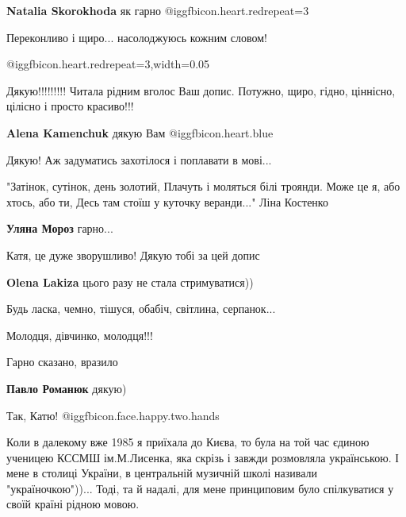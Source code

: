 \begin{itemize}
\begin{itemize} %
\textbf{Natalia Skorokhoda} як гарно @igg{fbicon.heart.red}{repeat=3}
\end{itemize} %

Переконливо і щиро... насолоджуюсь кожним словом!


@igg{fbicon.heart.red}{repeat=3,width=0.05}

Дякую!!!!!!!!! Читала рідним вголос Ваш допис. Потужно, щиро, гідно, ціннісно,
цілісно і просто красиво!!!

\begin{itemize} %
\textbf{Alena Kamenchuk} дякую Вам  @igg{fbicon.heart.blue} 
\end{itemize} %

Дякую! Аж задуматись захотілося і поплавати в мові...

\obeycr
"Затінок, сутінок, день золотий,
Плачуть і моляться білі троянди.
Може це я, або хтось, або ти,
Десь там стоїш у куточку веранди..." Ліна Костенко
\restorecr

\begin{itemize} %
\textbf{Уляна Мороз} гарно...
\end{itemize} %

Катя, це дуже зворушливо! Дякую тобі за цей допис

\begin{itemize} %
\textbf{Olena Lakiza} цього разу не стала стримуватися))
\end{itemize} %

Будь ласка, чемно, тішуся, обабіч, світлина, серпанок...

Молодця, дівчинко, молодця!!!

Гарно сказано, вразило

\begin{itemize} %
\textbf{Павло Романюк} дякую)
\end{itemize} %

Так, Катю! @igg{fbicon.face.happy.two.hands} 

Коли в далекому вже 1985 я приїхала до Києва, то була на той час єдиною
ученицею КССМШ ім.М.Лисенка, яка скрізь і завжди розмовляла українською. І мене
в столиці України, в центральній музичній школі називали "україночкою"))...
Тоді, та й надалі, для мене принциповим було спілкуватися у своїй країні рідною
мовою.


\end{itemize}
